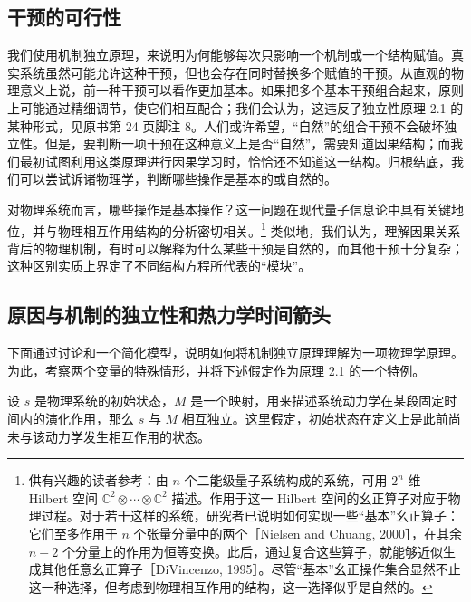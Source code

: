\subsection{干预的可行性}
\label{sec:ch02-feasibility-interventions}

我们使用机制独立原理，来说明为何能够每次只影响一个机制或一个结构赋值。真实系统虽然可能允许这种干预，但也会存在同时替换多个赋值的干预。从直观的物理意义上说，前一种干预可以看作更加基本。如果把多个基本干预组合起来，原则上可能通过精细调节，使它们相互配合；我们会认为，这违反了独立性原理 2.1 的某种形式，见原书第 24 页脚注 8。人们或许希望，“自然”的组合干预不会破坏独立性。但是，要判断一项干预在这种意义上是否“自然”，需要知道因果结构；而我们最初试图利用这类原理进行因果学习时，恰恰还不知道这一结构。归根结底，我们可以尝试诉诸物理学，判断哪些操作是基本的或自然的。

对物理系统而言，哪些操作是基本操作？这一问题在现代量子信息论中具有关键地位，并与物理相互作用结构的分析密切相关。\footnote{供有兴趣的读者参考：由 $n$ 个二能级量子系统构成的系统，可用 $2^n$ 维 Hilbert 空间 $\mathbb{C}^2\otimes\cdots\otimes\mathbb{C}^2$ 描述。作用于这一 Hilbert 空间的幺正算子对应于物理过程。对于若干这样的系统，研究者已说明如何实现一些“基本”幺正算子：它们至多作用于 $n$ 个张量分量中的两个［Nielsen and Chuang, 2000］，在其余 $n-2$ 个分量上的作用为恒等变换。此后，通过复合这些算子，就能够近似生成其他任意幺正算子［DiVincenzo, 1995］。尽管“基本”幺正操作集合显然不止这一种选择，但考虑到物理相互作用的结构，这一选择似乎是自然的。}
类似地，我们认为，理解因果关系背后的物理机制，有时可以解释为什么某些干预是自然的，而其他干预十分复杂；这种区别实质上界定了不同结构方程所代表的“模块”。

\subsection{原因与机制的独立性和热力学时间箭头}
\label{sec:ch02-thermodynamic-arrow}

下面通过讨论和一个简化模型，说明如何将机制独立原理理解为一项物理学原理。为此，考察两个变量的特殊情形，并将下述假定作为原理 2.1 的一个特例。



\FloatBarrier
{}
\begin{principle}[初始状态与动力学定律]
设 $s$ 是物理系统的初始状态，$M$ 是一个映射，用来描述系统动力学在某段固定时间内的演化作用，那么 $s$ 与 $M$ 相互独立。这里假定，初始状态在定义上是此前尚未与该动力学发生相互作用的状态。
\end{principle}

